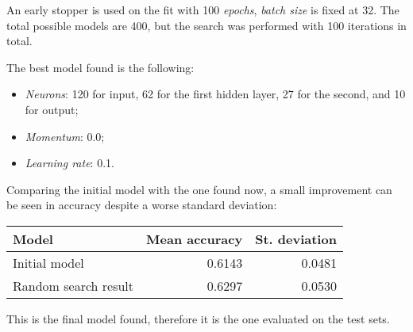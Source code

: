 An early stopper is used on the fit with 100 \emph{epochs}, \emph{batch size} 
is fixed at 
32.
The total possible models are 400, but the search was performed with 100 iterations
in total.

The best model found is the following: 
\begin{itemize}
    \item \emph{Neurons}: 120 for input, 62 for the first hidden layer, 27 for the second, and 10 for output; 
    \item \emph{Momentum}: 0.0;
    \item \emph{Learning rate}: 0.1.
\end{itemize}
Comparing the initial model with the one found now, a small improvement 
can be seen in accuracy despite a worse standard deviation:
\begin{center}
    \begin{tabular}{ |l|r|r| } 
        \hline
        Model & Mean accuracy & St. deviation \\
        \hline
        Initial model & 0.6143 & 0.0481\\
        Random search result & 0.6297 & 0.0530 \\
        \hline
    \end{tabular}
\end{center}

This is the final model found, therefore it is the one
evaluated on the test sets.
\newpage